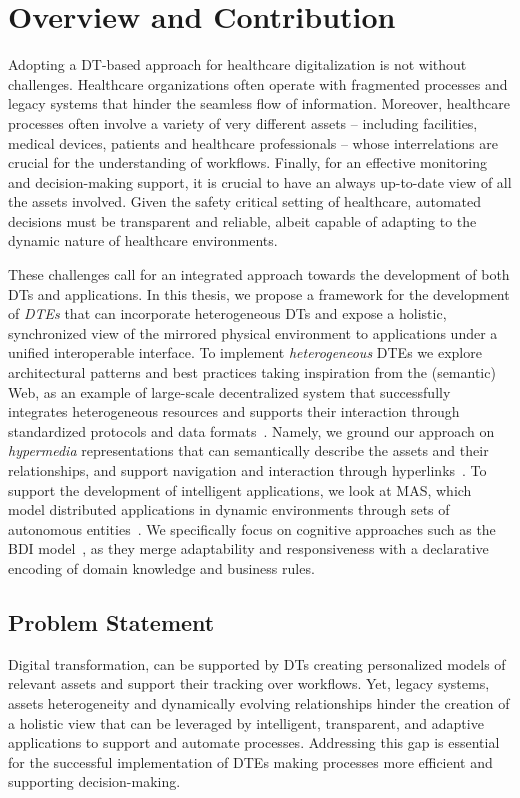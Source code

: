 \section*{Overview and Contribution}

Adopting a \ac{DT}-based approach for healthcare digitalization is not without challenges.
%
Healthcare organizations often operate with fragmented processes and legacy systems that hinder the seamless flow of information.
%
Moreover, healthcare processes often involve a variety of very different assets
-- including facilities, medical devices, patients and healthcare professionals --
whose interrelations are crucial for the understanding of workflows.
%
Finally, for an effective monitoring and decision-making support, it is crucial to have an always up-to-date view of all the assets involved.
%
Given the safety critical setting of healthcare, automated decisions must be transparent and reliable, albeit capable of adapting to the dynamic nature of healthcare environments.


These challenges call for an integrated approach towards the development of both \acp{DT} and applications.
%
In this thesis, we propose a framework for the development of \emph{\acp{DTE}} that can incorporate heterogeneous \acp{DT} and expose a holistic, synchronized view of the mirrored physical environment to applications under a unified interoperable interface.
%
To implement \emph{heterogeneous} \acp{DTE} we explore architectural patterns and best practices taking inspiration from the (semantic) Web, as an example of large-scale decentralized system that successfully integrates heterogeneous resources and supports their interaction through standardized protocols and data formats~\missingref{}.
%
Namely, we ground our approach on \emph{hypermedia} representations that can semantically describe the assets and their relationships, and support navigation and interaction through hyperlinks~\missingref{}.
%
To support the development of intelligent applications, we look at \ac{MAS}, which model distributed applications in dynamic environments through sets of autonomous entities~\missingref{}.
We specifically focus on cognitive approaches such as the \ac{BDI} model~\missingref{}, as they merge adaptability and responsiveness with a declarative encoding of domain knowledge and business rules.

\subsection*{Problem Statement}
Digital transformation, can be supported by \aclp{DT} creating personalized models of relevant assets and support their tracking over workflows.
Yet, legacy systems, assets heterogeneity and dynamically evolving relationships hinder the creation of a holistic view that can be leveraged by intelligent, transparent, and adaptive applications to support and automate processes.
Addressing this gap is essential for the successful implementation of \aclp{DTE} making processes more efficient and supporting decision-making.

